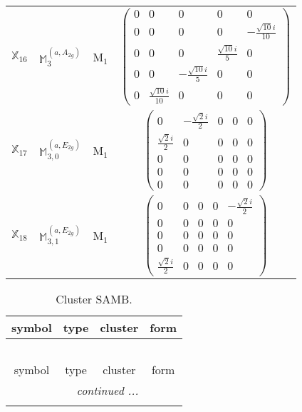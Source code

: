 \documentclass[fleqn,10pt,landscape]{article}
\begin{document}
\begin{itemize}
\begin{center}
\begin{longtable}{c|c|c|c}
$ \mathbb{X}_{16} $ & $\mathbb{M}_{3}^{(a,A_{2g})}$ & M$_{1}$ & $\begin{pmatrix} 0 & 0 & 0 & 0 & 0 \\ 0 & 0 & 0 & 0 & - \frac{\sqrt{10} i}{10} \\ 0 & 0 & 0 & \frac{\sqrt{10} i}{5} & 0 \\ 0 & 0 & - \frac{\sqrt{10} i}{5} & 0 & 0 \\ 0 & \frac{\sqrt{10} i}{10} & 0 & 0 & 0 \end{pmatrix}$ \\
$ \mathbb{X}_{17} $ & $\mathbb{M}_{3,0}^{(a,E_{2g})}$ & M$_{1}$ & $\begin{pmatrix} 0 & - \frac{\sqrt{2} i}{2} & 0 & 0 & 0 \\ \frac{\sqrt{2} i}{2} & 0 & 0 & 0 & 0 \\ 0 & 0 & 0 & 0 & 0 \\ 0 & 0 & 0 & 0 & 0 \\ 0 & 0 & 0 & 0 & 0 \end{pmatrix}$ \\
$ \mathbb{X}_{18} $ & $\mathbb{M}_{3,1}^{(a,E_{2g})}$ & M$_{1}$ & $\begin{pmatrix} 0 & 0 & 0 & 0 & - \frac{\sqrt{2} i}{2} \\ 0 & 0 & 0 & 0 & 0 \\ 0 & 0 & 0 & 0 & 0 \\ 0 & 0 & 0 & 0 & 0 \\ \frac{\sqrt{2} i}{2} & 0 & 0 & 0 & 0 \end{pmatrix}$ \\
\end{longtable}
\end{center}
\begin{center}
\renewcommand{\arraystretch}{1.3}
\begin{longtable}{c|c|c|c}
\caption{Cluster SAMB.}
 \\
 \hline \hline
symbol & type & cluster & form \\ \hline \endfirsthead

\multicolumn{3}{l}{\tablename\ \thetable{}} \\
 \hline \hline
symbol & type & cluster & form \\ \hline \endhead

 \hline \hline
\multicolumn{3}{r}{\footnotesize\it continued ...} \\ \endfoot


\end{longtable}
\end{center}
\end{itemize}
\end{document}
